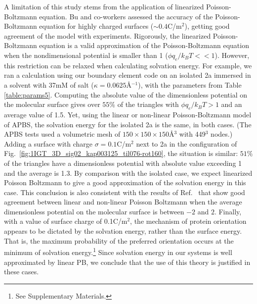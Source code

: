  \medskip
A limitation of this study stems from the application of linearized Poisson-Boltzmann equation.
Bu and co-workers\cite{BuVakninTravesset2006} assessed the accuracy of the Poisson-Boltzmann equation for highly charged surfaces ($\sim 0.4$C/m$^2$), getting good agreement of the model with experiments. 
Rigorously, the linearized Poisson-Boltzmann equation is a valid approximation of the Poisson-Boltzmann equation when the nondimensional potential is smaller than 1 ($\phi q_e/k_BT<<1$).
However, this restriction can be relaxed when calculating solvation energy. 
For example, we ran a calculation using our boundary element code on an isolated \ig 2a immersed in a solvent with 37mM of salt ($\kappa = 0.0625$\AA$^{-1}$), with the parameters from Table \ref{table:params5}. 
Computing the absolute value of the dimensionless potential on the molecular surface gives over $55\%$ of the triangles with $\phi q_e/k_BT>1$ and an average value of 1.5.
Yet, using the linear or non-linear Poisson-Boltzmann model of APBS,\cite{BakerETal2001} the solvation energy for the isolated \ig 2a is the same, in both cases.
(The APBS tests used a volumetric mesh of $150\times 150\times 150$\AA$^3$ with 449$^3$ nodes.)
Adding a surface with charge $\sigma=0.1$C/m$^2$ next to \ig 2a in the configuration of Fig.~\ref{fig:1IGT_3D_sig02_kap003125_til076-rot160}, the situation is similar: $51\%$ of the triangles have a dimensionless potential with absolute value exceeding 1 and the average is 1.3. By comparison with the isolated  case, we expect linearized Poisson Boltzmann to give a good approximation of the solvation energy in this case.
This conclusion is also consistent with the results of Ref.~ that show good agreement between linear and non-linear Poisson Boltzmann when the average dimensionless potential on the molecular surface is between $-2$ and $2$. 
Finally, with a value of surface charge of 0.1C/m$^2$, the mechanism of protein orientation appears to be dictated by the solvation energy, rather than the surface energy. That is, the maximum probability of the preferred orientation occurs at the minimum of solvation energy.\footnote{See Supplementary Materials.} Since solvation energy in our systems is well approximated by linear PB, we conclude that the use of this theory is justified in these cases.

